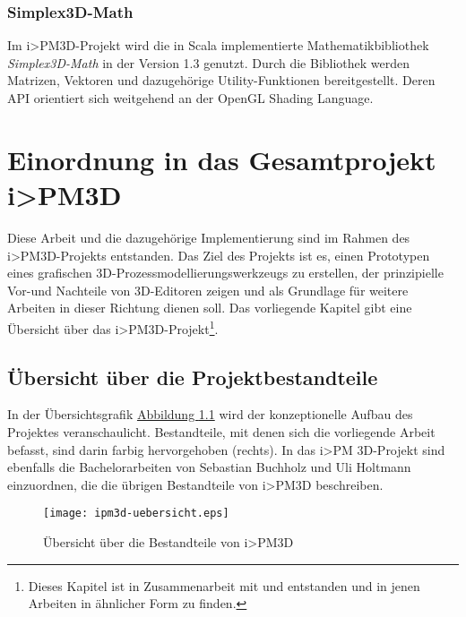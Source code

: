 \documentclass[a4paper,10pt]{sphinxmanual}
\begin{document}
\subsection{Simplex3D-Math}
\label{verwendet:simplex3d-math}\label{verwendet:simplex3d}
Im i\textgreater{}PM3D-Projekt wird die in Scala implementierte Mathematikbibliothek \emph{Simplex3D-Math} in der Version 1.3 \cite{www:simplex3d} genutzt.
Durch die Bibliothek werden Matrizen, Vektoren und dazugehörige Utility-Funktionen bereitgestellt. Deren API orientiert sich weitgehend an der OpenGL Shading Language.


\chapter{Einordnung in das Gesamtprojekt i\textgreater{}PM3D}
\label{ipm3d:ipm3d}\label{ipm3d:einordnung-in-das-gesamtprojekt-i-pm3d}\label{ipm3d::doc}
Diese Arbeit und die dazugehörige Implementierung sind im Rahmen des i\textgreater{}PM3D-Projekts entstanden. Das Ziel des Projekts ist es, einen Prototypen eines grafischen 3D-Prozessmodellierungswerkzeugs zu erstellen, der prinzipielle Vor-und Nachteile von 3D-Editoren zeigen und als Grundlage für weitere Arbeiten in dieser Richtung dienen soll.
Das vorliegende Kapitel gibt eine Übersicht über das i\textgreater{}PM3D-Projekt\footnote{
Dieses Kapitel ist in Zusammenarbeit mit \cite{buchi} und \cite{uli} entstanden und in jenen Arbeiten in ähnlicher Form zu finden.
}.


\section{Übersicht über die Projektbestandteile}
\label{ipm3d:ipm3d-uebersicht}\label{ipm3d:ubersicht-uber-die-projektbestandteile}
In der Übersichtsgrafik \hyperref[ipm3d:ipm3d-konzeptionelle-uebersicht]{Abbildung  \ref*{ipm3d:ipm3d-konzeptionelle-uebersicht}} wird der konzeptionelle Aufbau des Projektes veranschaulicht.
Bestandteile, mit denen sich die vorliegende Arbeit befasst, sind darin farbig hervorgehoben (rechts).
In das i\textgreater{}PM 3D-Projekt sind ebenfalls die Bachelorarbeiten von Sebastian Buchholz \cite{buchi} und Uli Holtmann \cite{uli} einzuordnen, die die übrigen Bestandteile von i\textgreater{}PM3D beschreiben.
\begin{figure}[htbp]
\centering
\capstart

\texttt{[image: ipm3d-uebersicht.eps]}
\caption{Übersicht über die Bestandteile von i\textgreater{}PM3D}\label{ipm3d:ipm3d-konzeptionelle-uebersicht}\end{figure}
\end{document}
